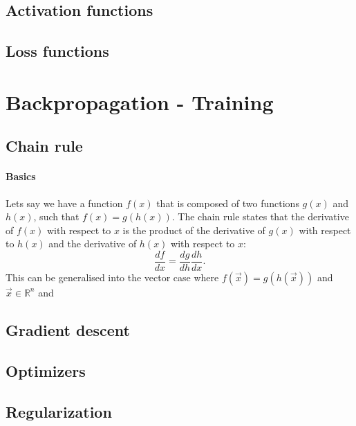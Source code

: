     \subsection{Activation functions}
    \subsection{Loss functions}

\section{Backpropagation - Training}
    \subsection{Chain rule}
        \paragraph{Basics}
        Lets say we have a function $f(x)$ that is composed of two functions $g(x)$ and $h(x)$, such that $f(x) = g(h(x))$. The chain rule states that the derivative of $f(x)$ with respect to $x$ is the product of the derivative of $g(x)$ with respect to $h(x)$ and the derivative of $h(x)$ with respect to $x$:
        \begin{equation}
            \frac{df}{dx} = \frac{dg}{dh} \frac{dh}{dx}.
        \end{equation}
        This can be generalised into the vector case where $f(\vec{x}) = g(h(\vec{x}))$ and $\vec{x} \in \mathbb{R}^n$ and 
    \subsection{Gradient descent}
    \subsection{Optimizers}
    \subsection{Regularization} %




